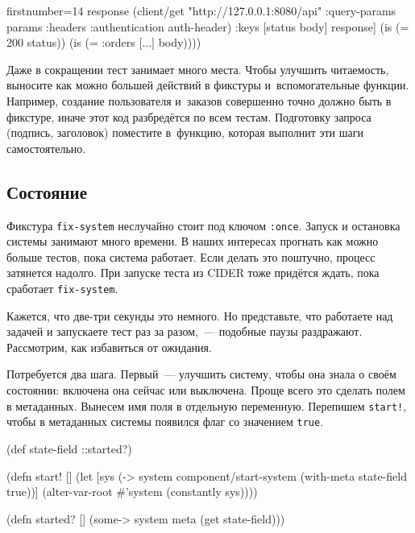 \else

\begin{english}
  \begin{clojure/lines*}{firstnumber=14}
        response (client/get "http://127.0.0.1:8080/api"
                   {:query-params params
                    :headers {:authentication auth-header}})
        {:keys [status body]} response]
    (is (= 200 status))
    (is (= {:orders [...]} body))))
  \end{clojure/lines*}
\end{english}

\fi

Даже в сокращении тест занимает много места. Чтобы улучшить читаемость, выносите
как можно большей действий в фикстуры и~вспомогательные функции. Например,
создание пользователя и~заказов совершенно точно должно быть в фикстуре, иначе
этот код разбредётся по всем тестам. Подготовку запроса (подпись, заголовок)
поместите в~функцию, которая выполнит эти шаги самостоятельно.

\subsection{Состояние}

Фикстура \verb|fix-system| неслучайно стоит под ключом \verb|:once|. Запуск
и остановка системы занимают много времени. В наших интересах прогнать как можно
больше тестов, пока система работает. Если делать это поштучно, процесс
затянется надолго. При запуске теста из CIDER тоже придётся ждать, пока
сработает \verb|fix-system|.

Кажется, что две-три секунды это немного. Но представьте, что работаете над
задачей и запускаете тест раз за разом,~--- подобные паузы
раздражают. Рассмотрим, как избавиться от ожидания.


Потребуется два шага. Первый~--- улучшить систему, чтобы она знала о своём
состоянии: включена она сейчас или выключена. Проще всего это сделать полем в
метаданных. Вынесем имя поля в отдельную переменную. Перепишем \verb|start!|,
чтобы в метаданных системы появился флаг со значением \verb|true|.

\ifx\DEVICETYPE\MOBILE

\begin{english}
  \begin{clojure}
(def state-field ::started?)

(defn start! []
  (let [sys
        (-> system
            component/start-system
            (with-meta
              {state-field true}))]
    (alter-var-root
      #'system (constantly sys))))

(defn started? []
  (some-> system meta (get state-field)))
  \end{clojure}
\end{english}

